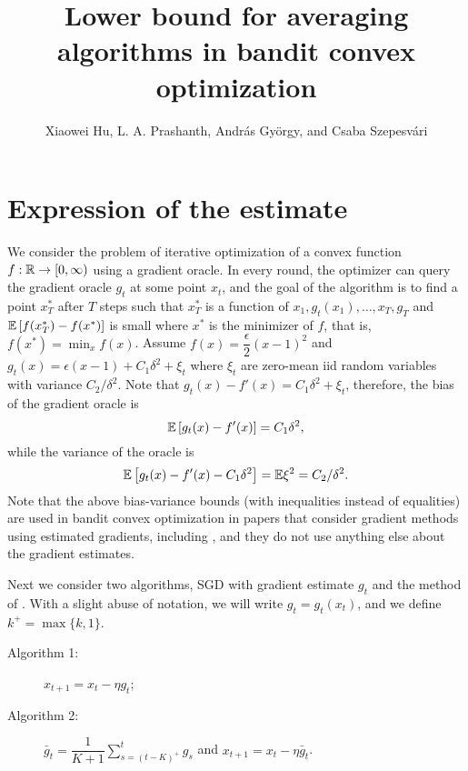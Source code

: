 \documentclass[11pt,letterpaper,english]{article}
\author{Xiaowei Hu, L. A. Prashanth, Andr\'as Gy\"orgy, and Csaba Szepesv\'ari}
\title{Lower bound for averaging algorithms in bandit convex optimization}
\begin{document}
\maketitle

\section{Expression of the estimate}


We consider the problem of iterative optimization of a convex function $f:\mathbb{R} \to [0,\infty)$ using a gradient oracle.
In every round, the optimizer can query the gradient oracle $g_t$ at some point $x_t$, and the goal of the algorithm is to find a point $x^*_T$ after $T$ steps such that $x^*_T$ is a function of $x_1,g_t(x_1),\ldots, x_{T},g_T$ and $\mathbb{E}\left[f(x^*_T)-f(x^*)\right]$ is small where $x^*$ is the minimizer of $f$, that is, $f(x^*)=\min_x f(x)$. Assume $f(x) = \dfrac{\epsilon}{2} (x-1)^2$ and 
$g_t(x) = \epsilon (x-1) + C_1 \delta^2 + \xi_t$ where $\xi_t$ are zero-mean iid random variables with variance $C_2 /\delta^2$.
Note that 
$g_t(x)-f'(x)=C_1 \delta^2 + \xi_t$, therefore, the bias of the gradient oracle is 
\[
\mathbb{E}\left[g_t(x)-f'(x)\right]=C_1 \delta^2,
\] 
while the variance of the oracle is
\[
\mathbb{E}\left[g_t(x)-f'(x)-C_1 \delta^2\right] = \mathbb{E}{\xi^2} = C_2 /\delta^2.
\]
Note that the above bias-variance bounds (with inequalities instead of equalities) are used in bandit convex optimization in papers that consider gradient methods using estimated gradients, including \citep{DekelEK15}, and they do not use anything else about the gradient estimates.

Next we consider two algorithms, SGD with gradient estimate $g_t$ and the method of \citet{DekelEK15}. With a slight abuse of notation, we will write $g_t=g_t(x_t)$, and we define $k^+=\max\{k,1\}$.
\begin{description}
\item[Algorithm 1:] $ x_{t+1} = x_t - \eta  g_t$;

\item[Algorithm 2:] $\bar{g}_t = \dfrac{1}{K+1}  \sum_{s=(t-K)^+}^t g_s$ and
$x_{t+1} = x_t - \eta  \bar{g}_t$.
\end{description}
\end{document}
